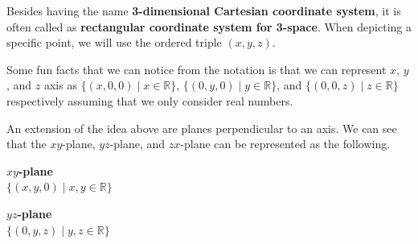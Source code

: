 \documentclass[../../main.tex]{subfiles}
\begin{document}
Besides having the name \textbf{3-dimensional Cartesian coordinate
system}, it is often called as \textbf{rectangular coordinate system
for 3-space}. When depicting a specific point, we will use the
ordered triple $(x, y, z)$.

Some fun facts that we can notice from the notation is that we can
represent $x$, $y$, and $z$ axis as $\{ (x, 0, 0) \mid x \in
\mathbb{R} \}$, $\{ (0, y, 0) \mid y \in \mathbb{R} \}$, and
$\{ (0, 0, z) \mid z \in \mathbb{R} \}$ respectively assuming that
we only consider real numbers.

An extension of the idea above are planes perpendicular to an axis.
We can see that the $xy$-plane, $yz$-plane, and $zx$-plane can be
represented as the following.

\begin{minipage}{0.3\textwidth}
\begin{center}
\textbf{$xy$-plane} \\
$\{ (x, y, 0) \mid x, y \in \mathbb{R} \}$
\end{center}
\begin{figure}[H]
\centering
{}
\end{figure}
\end{minipage}
\hfill
\begin{minipage}{0.3\textwidth}
\begin{center}
\textbf{$yz$-plane} \\
$\{ (0, y, z) \mid y, z \in \mathbb{R} \}$
\end{center}
\begin{figure}[H]
\centering
{}
\end{figure}
\end{minipage}
\end{document}
